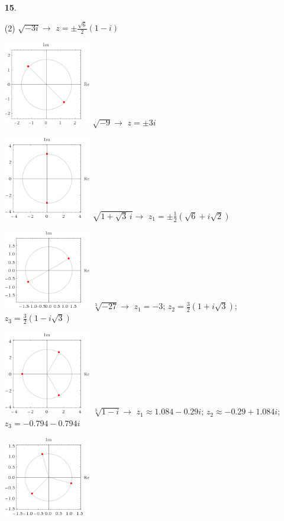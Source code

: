 \documentclass[a4paper, pdf, twoside]{book}
\begin{document}
\begin{multicols}{2}
\begin{enumerate}
 \item[\fontfamily{phv}\selectfont\color{blue}\textbf{15}. ] 
 \begin{tasks}[column-sep=1em, item-indent=1.3333em](2)
	 \task* $\sqrt {-3 i} \rightarrow $ $z=\pm \frac {\sqrt {6}}{2}(1-i)$ \par \includegraphics [width=0.3\textwidth ]{img-sol/t4-15a}
	 \task* $\sqrt {-9}\rightarrow $ $z=\pm 3i$ \par \includegraphics [width=0.3\textwidth ]{img-sol/t4-15b}
	 \task* $\sqrt {1+\sqrt {3} \,i}\rightarrow $ $z_1=\pm \frac {1}{2}(\sqrt {6}+i\sqrt {2})$ \par \includegraphics [width=0.3\textwidth ]{img-sol/t4-15c}
	 \task* $\sqrt [3]{-27}\rightarrow $ $z_1=-3$; $z_2=\frac {3}{2}(1+i\sqrt {3})$; $z_3=\frac {3}{2}(1-i\sqrt {3})$ \par \includegraphics [width=0.3\textwidth ]{img-sol/t4-15d}
	 \task* $\sqrt [3]{1-i}\rightarrow $ $z_1\approx 1.084-0.29i$; $z_2 \approx -0.29 +1.084i$; $z_3=-0.794-0.794i$ \par \includegraphics [width=0.3\textwidth ]{img-sol/t4-15e}

\end{tasks}
\end{enumerate}
\end{multicols}
\end{document}
